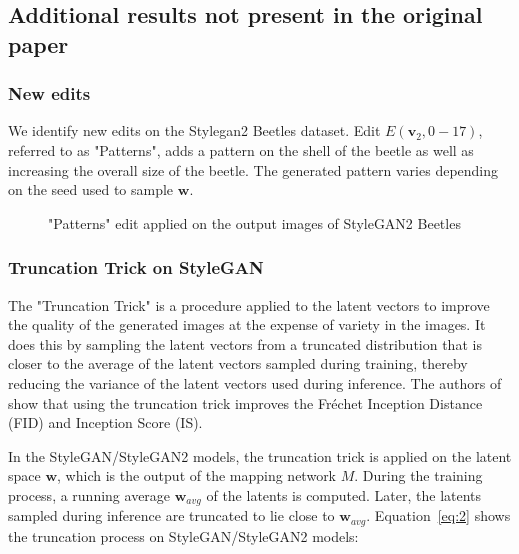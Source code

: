 \subsection{Additional results not present in the original paper}

\subsubsection{New edits}

We identify new edits on the Stylegan2 Beetles dataset. Edit $E(\mathbf{v}_{2}, 0-17)$, referred to as "Patterns", adds a pattern on the shell of the beetle as well as increasing the overall size of the beetle. The generated pattern varies depending on the seed used to sample $\mathbf{w}$.

\begin{figure}[H]



\caption{"Patterns" edit applied on the output images of StyleGAN2 Beetles}

\end{figure}

\subsubsection{Truncation Trick on StyleGAN}

The "Truncation Trick" is a procedure applied to the latent vectors to improve the quality of the generated images at the expense of variety in the images. It does this by sampling the latent vectors from a truncated distribution that is closer to the average of the latent vectors sampled during training, thereby reducing the variance of the latent vectors used during inference. The authors of \cite{biggan} show that using the truncation trick improves the Fréchet Inception Distance (FID) and Inception Score (IS).

In the StyleGAN/StyleGAN2 models, the truncation trick is applied on the latent space $\mathbf{w}$, which is the output of the mapping network $M$. During the training process, a running average $\mathbf{w}_{avg}$ of the latents is computed. Later, the latents sampled during inference are truncated to lie close to $\mathbf{w}_{avg}$. Equation~\ref{eq:2} shows the truncation process on StyleGAN/StyleGAN2 models:

